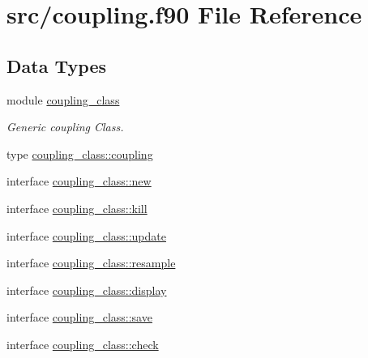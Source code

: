 \hypertarget{coupling_8f90}{\section{src/coupling.f90 File Reference}
\label{coupling_8f90}
}
\subsection*{Data Types}
\begin{DoxyCompactItemize}
\item 
module \hyperlink{classcoupling__class}{coupling\+\_\+class}
\begin{DoxyCompactList}\small\item\em Generic coupling Class. \end{DoxyCompactList}\item 
type \hyperlink{structcoupling__class_1_1coupling}{coupling\+\_\+class\+::coupling}
\item 
interface \hyperlink{interfacecoupling__class_1_1new}{coupling\+\_\+class\+::new}
\item 
interface \hyperlink{interfacecoupling__class_1_1kill}{coupling\+\_\+class\+::kill}
\item 
interface \hyperlink{interfacecoupling__class_1_1update}{coupling\+\_\+class\+::update}
\item 
interface \hyperlink{interfacecoupling__class_1_1resample}{coupling\+\_\+class\+::resample}
\item 
interface \hyperlink{interfacecoupling__class_1_1display}{coupling\+\_\+class\+::display}
\item 
interface \hyperlink{interfacecoupling__class_1_1save}{coupling\+\_\+class\+::save}
\item 
interface \hyperlink{interfacecoupling__class_1_1check}{coupling\+\_\+class\+::check}
\end{DoxyCompactItemize}

